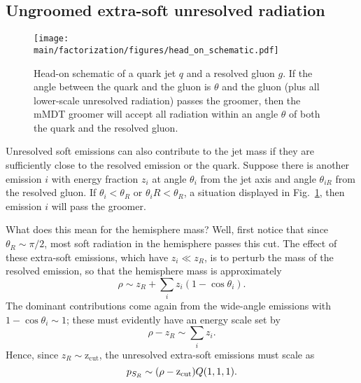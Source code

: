 \documentclass[12pt,twoside,class=../reedthesis, crop=false]{standalone}
\newcommand{\zcut}{\mathrm{z_{cut}}}
\begin{document}
\subsection{Ungroomed extra-soft unresolved radiation}
	\begin{figure}
	\begin{centering}
		\texttt{[image: \\main/factorization/figures/head\_on\_schematic.pdf]}
		\caption{\label{fig:head-on schematic}Head-on schematic of a quark jet $q$ and a resolved gluon $g$. If the angle between the quark and the gluon is $\theta$ and the gluon (plus all lower-scale unresolved radiation) passes the groomer, then the mMDT groomer will accept all radiation within an angle $\theta$ of both the quark and the resolved gluon.}
	\end{centering}
	\end{figure}
	Unresolved soft emissions can also contribute to the jet mass if they are sufficiently close to the resolved emission or the quark. Suppose there is another emission $i$ with energy fraction $z_i$ at angle $\theta_i$ from the jet axis and angle $\theta_{iR}$ from the resolved gluon. If $\theta_i < \theta_R$ or $\theta_iR < \theta_R$, a situation displayed in Fig.~\ref{fig:head-on schematic}, then emission $i$ will pass the groomer.

	What does this mean for the hemisphere mass? Well, first notice that since $\theta_R \sim \pi/2$, most soft radiation in the hemisphere passes this cut. The effect of these extra-soft emissions, which have $z_i \ll z_R$, is to perturb the mass of the resolved emission, so that the hemisphere mass is approximately
	\begin{equation}
		\rho \sim z_R + \sum_i z_i(1 - \cos\theta_i).
	\end{equation}
	The dominant contributions come again from the wide-angle emissions with $1 - \cos\theta_i \sim 1$; these must evidently have an energy scale set by
	\begin{equation}
		\rho - z_R \sim \sum_i z_i.
	\end{equation}
	Hence, since $z_R \sim \zcut$, the unresolved extra-soft emissions must scale as
	\begin{equation}
		p_{S_R} \sim \qty(\rho - \zcut)Q(1, 1, 1).
	\end{equation}
\end{document}
